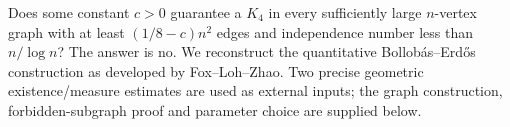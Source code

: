 Does some constant $c>0$ guarantee a $K_4$ in every sufficiently large $n$-vertex graph with at least $(1/8-c)n^2$ edges and independence number less than $n/\log n$? The answer is no. We reconstruct the quantitative Bollob\'as--Erd\H{o}s construction as developed by Fox--Loh--Zhao. Two precise geometric existence/measure estimates are used as external inputs; the graph construction, forbidden-subgraph proof and parameter choice are supplied below.
